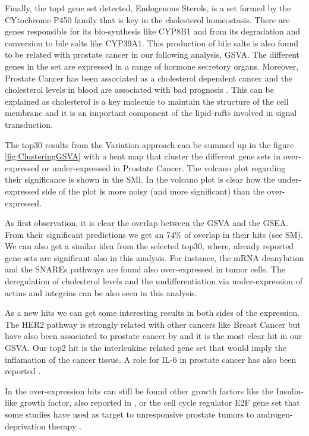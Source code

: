 \documentclass[9pt,twocolumn,twoside]{gsajnl}
\begin{document}
Finally, the top4 gene set detected, Endogenous Sterols, is a set formed by the CYtochrome P450 family that is key in the cholesterol homeostasis. There are genes responsible for its bio-synthesis like CYP8B1 and from its degradation and conversion to bile salts like CYP39A1. This production of bile salts is also found to be related with prostate cancer in our following analysis, GSVA. The different genes in the set are expressed in a range of hormone secretory organs. Moreover, Prostate Cancer has been associated as a cholesterol dependent cancer and the cholesterol levels in blood are associated with bad prognosis \cite{krycer2013cholesterol}. This can be explained as cholesterol is a key molecule to  maintain the structure of the cell membrane and it is an important component of the lipid-rafts involved in signal transduction.


The top30 results from the Variation approach can be summed up in the figure \ref{fig:ClusteringGSVA} with a heat map that cluster the different gene sets in over-expressed or under-expressed in Prostate Cancer. The volcano plot regarding their significance is shown in the SMl. In the volcano plot is clear how the under-expressed side of the plot is more noisy (and more significant) than the over-expressed.

As first observation, it is clear the overlap between the GSVA and the GSEA. From their significant predictions we get an 74\% of overlap in their hits (see SM). We can also get a similar idea from the selected top30, where, already reported gene sets are significant also in this analysis. For instance, the mRNA deanylation and the SNAREs pathways are found also over-expressed in tumor cells. The deregulation of cholesterol levels and the undifferentiation via under-expression of actins and integrins can be also seen in this analysis.

As a new hits we can get some interesting results in both sides of the expression. The HER2 pathway is strongly related with other cancers like Breast Cancer but have also been associated to prostate cancer by \cite{yeh1999her2} and it is the most clear hit in our GSVA. Our top2 hit is the interleukine related gene set that would imply the inflamation of the cancer tissue. A role for IL-6 in prostate cancer has also been reported \citep{chung1999characterization}.

In the over-expression hits can still be found other growth factors like the Insulin-like growth factor, also reported in \cite{hellawell2002expression}, or the cell cycle regulator E2F gene set that some studies have used as target to unresponsive prostate tumors to androgen-deprivation therapy \citep{kaseb2007androgen}.
\end{document}
